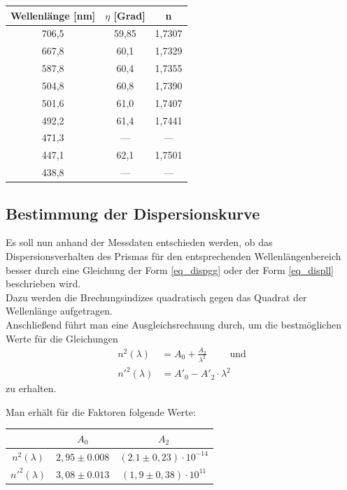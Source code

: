 \begin{table}[H]
\begin{tabular}{|c|c|c|}
Wellenlänge [nm] & $\eta$ [Grad] & n \\ \hline
706,5	&59,85	&1,7307 \\ \hline
667,8	&60,1	&1,7329 \\ \hline
587,8	&60,4	&1,7355 \\ \hline
504,8	&60,8	&1,7390 \\ \hline
501,6	&61,0		&1,7407 \\ \hline
492,2	&61,4	&1,7441 \\ \hline
471,3	&---&		---		 \\ \hline
447,1	&62,1&	1,7501 \\ \hline
438,8	&---	&	--- \\ \hline
\end{tabular} 
\end{table}

\subsection{Bestimmung der Dispersionskurve}
Es soll nun anhand der Messdaten entschieden werden, ob das Dispersionsverhalten des Prismas für den entsprechenden Wellenlängenbereich besser durch eine Gleichung der Form \eqref{eq_dispgg} oder der Form \eqref{eq_displl} beschrieben wird.\\
Dazu werden die Brechungsindizes quadratisch gegen das Quadrat der Wellenlänge aufgetragen.\\

Anschließend führt man eine Ausgleichsrechnung durch, um die bestmöglichen Werte für die Gleichungen
\begin{align*}
n^2(\lambda) &= A_0 + \frac{A_2}{\lambda^2} \qquad \text{ und}\\
n'^2(\lambda) &= A'_0 - A'_2\cdot\lambda^2
\end{align*}
zu erhalten.

Man erhält für die Faktoren folgende Werte:
\begin{table}[H]
\begin{tabular}{c|c|c}
 & $A_0$ & $A_2$ \\ 
\hline 
$n^2(\lambda)$ &  $2,95 \pm 0.008$ & $(2.1 \pm 0,23)\cdot 10^{-14}$ \\ 
\hline 
$n'^2(\lambda)$ & $3,08 \pm 0.013$ & $(1,9 \pm 0,38)\cdot 10^{11}$ \\ 
\hline 
\end{tabular} 
\end{table}

